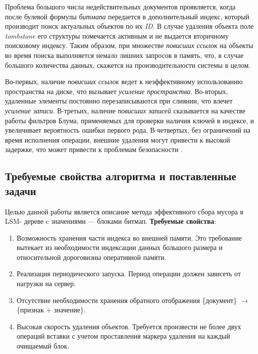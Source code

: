 Проблема большого числа недействительных документов проявляется, когда после
булевой формулы \textit{битмапа} передается в дополнительный индекс, который производит
поиск актуальных объектов по их \textit{ID}. В случае удаления объекта поле
\textit{tombstone} его структуры помечается активным и не выдается вторичному
поисковому индексу. Таким образом, при множестве \textit{повисших ссылок} на
объекты во время поиска выполняется немало лишних запросов в память, что, в
случае большого количества данных, скажется на производительности системы в целом.

Во-первых, наличие \textit{повисших ссылок} ведет к неэффективному использованию
пространства на диске, что вызывает \textit{усиление пространства}. Во-вторых,
удаленные элементы постоянно перезаписываются при слиянии, что влечет
\textit{усиление записи}. В-третьих, наличие \textit{повисших записей} сказывается
на качестве работы фильтров Блума, применяемых для проверки наличия ключей в
индексе, и увеличивает вероятность ошибки первого рода. В-четвертых, без
ограничений на время исполнения операции, внешние удаления могут привести к высокой задержке,
что может привести к проблемам безопасности \cite{Lethe:2020}.
\label{amplification}

\subsection{Требуемые свойства алгоритма и поставленные задачи}

Целью данной работы является описание метода эффективного сбора мусора в LSM-
дереве c значениями — блоками битмап. \textbf{Требуемые свойства}:
\begin{enumerate}
    \item Возможность хранения части индекса во внешней памяти. Это требование вытекает
    из необходимости индексации данных большого размера и относительной дороговизны
    оперативной памяти.
    \item Реализация периодического запуска. Период операции должен зависеть от нагрузки 
    на сервер.
    \item Отсутствие необходимости хранения обратного отображения \{документ\} $\rightarrow$
    \{признак + значение\}.
    \item Высокая скорость удаления объектов. Требуется произвести не более двух операций
    вставки с учетом проставления маркера удаления на каждый очищаемый блок.
\end{enumerate}

